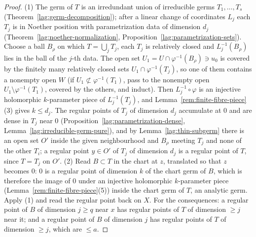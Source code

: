 \begin{proof}
\leanok
(1) The germ of \(T\) is an irredundant union of irreducible germs \(T_1,\dots,T_s\) (Theorem~\ref{lag:germ-decomposition}); after a linear change of coordinates
\(L_j\) each \(T_j\) is in Noether position with parametrization data of dimension \(d_j\) (Theorem~\ref{lag:noether-normalization},
Proposition~\ref{lag:parametrization-sets}). Choose a ball \(B_\rho\) on which \(T=\bigcup_jT_j\), each \(T_j\) is relatively closed and \(L_j^{-1}(B_\rho)\) lies in the
ball of the \(j\)-th data. The open set \(U_1=U\cap\varphi^{-1}(B_\rho)\ni u_0\) is covered by the finitely many relatively closed sets \(U_1\cap\varphi^{-1}(T_j)\), so one of
them contains a nonempty open \(W\) (if \(U_1\not\subset\varphi^{-1}(T_1)\), pass to the nonempty open \(U_1\setminus\varphi^{-1}(T_1)\), covered by the others, and induct).
Then \(L_j^{-1}\circ\varphi\) is an injective holomorphic \(k\)-parameter piece of \(L_j^{-1}(T_j)\), and Lemma~\ref{rem:finite-fibre-piece}(3) gives \(k\le d_j\). The regular
points of \(T_j\) of dimension \(d_j\) accumulate at \(0\) and are dense in \(T_j\) near \(0\) (Proposition~\ref{lag:parametrization-dense},
Lemma~\ref{lag:irreducible-germ-pure}), and by Lemma~\ref{lag:thin-subgerm} there is an open set \(O'\) inside the given neighbourhood and \(B_\rho\) meeting \(T_j\) and none of the
other \(T_i\); a regular point \(y\in O'\) of \(T_j\) of dimension \(d_j\) is a regular point of \(T\), since \(T=T_j\) on \(O'\).
(2) Read \(B\subset T\) in the chart at \(z\), translated so that \(z\) becomes \(0\): \(0\) is a regular point of dimension \(k\) of the chart germ of \(B\), which is therefore
the image of \(0\) under an injective holomorphic \(k\)-parameter piece (Lemma~\ref{rem:finite-fibre-piece}(5)) inside the chart germ of \(T\), an analytic germ. Apply (1) and
read the regular point back on \(X\). For the consequences: a regular point of \(B\) of dimension \(j\ge q\) near \(x\) has regular points of \(T\) of dimension \(\ge j\) near it;
and a regular point of \(B\) of dimension \(j\) has regular points of \(T\) of dimension \(\ge j\), which are \(\le a\).
\end{proof}

